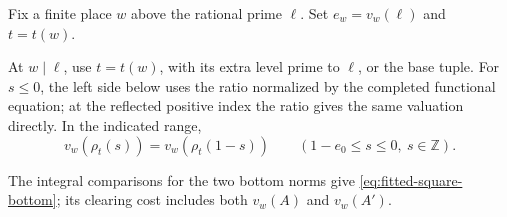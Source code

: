 Fix a finite place \(w\) above the rational prime \(\ell\).
Set \(e_w=v_w(\ell)\) and \(t=t(w)\).

\begin{proposition}\label{prop:fitted-square-bottom-index}
At \(w\mid\ell\), use \(t=t(w)\), with its extra level prime to
\(\ell\), or the base tuple. For \(s\le0\), the left side below uses the ratio normalized by
the completed functional equation; at the reflected positive index the ratio gives the same valuation directly. In the indicated range,
\[
 v_w(\rho_t(s))=v_w(\rho_t(1-s))\qquad(1-e_0\le s\le0,\ s\in\mathbb Z).
\]

The integral comparisons for the two bottom norms give
\eqref{eq:fitted-square-bottom}; its clearing cost includes both
\(v_w(A)\) and \(v_w(A')\).
\end{proposition}

